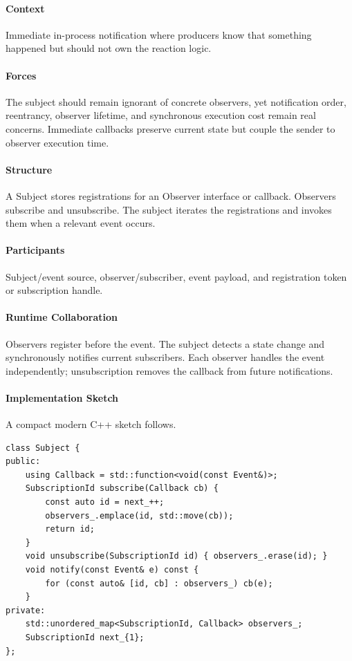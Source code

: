 \documentclass[11pt]{article}
\begin{document}
\paragraph{Context} Immediate in-process notification where producers know that something happened but should not own the reaction logic.
\paragraph{Forces} The subject should remain ignorant of concrete observers, yet notification order, reentrancy, observer lifetime, and synchronous execution cost remain real concerns. Immediate callbacks preserve current state but couple the sender to observer execution time.
\paragraph{Structure} A Subject stores registrations for an Observer interface or callback. Observers subscribe and unsubscribe. The subject iterates the registrations and invokes them when a relevant event occurs.
\paragraph{Participants} Subject/event source, observer/subscriber, event payload, and registration token or subscription handle.
\paragraph{Runtime Collaboration} Observers register before the event. The subject detects a state change and synchronously notifies current subscribers. Each observer handles the event independently; unsubscription removes the callback from future notifications.
\paragraph{Implementation Sketch} A compact modern C++ sketch follows.
\begin{lstlisting}
class Subject {
public:
    using Callback = std::function<void(const Event&)>;
    SubscriptionId subscribe(Callback cb) {
        const auto id = next_++;
        observers_.emplace(id, std::move(cb));
        return id;
    }
    void unsubscribe(SubscriptionId id) { observers_.erase(id); }
    void notify(const Event& e) const {
        for (const auto& [id, cb] : observers_) cb(e);
    }
private:
    std::unordered_map<SubscriptionId, Callback> observers_;
    SubscriptionId next_{1};
};
\end{lstlisting}
\end{document}
